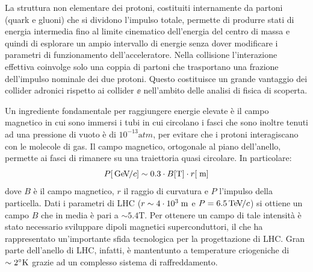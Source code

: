 La struttura non elementare dei protoni, costituiti internamente da partoni (quark e gluoni) che si dividono l'impulso totale, permette di produrre stati di energia intermedia fino al limite cinematico dell'energia del centro di massa e quindi di esplorare un ampio intervallo di energie senza dover modificare i parametri di funzionamento dell'acceleratore. Nella collisione l'interazione effettiva coinvolge solo una coppia di partoni che trasportano una frazione dell'impulso nominale dei due protoni. Questo costituisce un grande vantaggio dei collider adronici rispetto ai collider $\ee$ nell'ambito delle analisi di fisica di scoperta.


Un ingrediente fondamentale per raggiungere energie elevate \`e il campo magnetico in cui sono immersi i tubi in cui circolano i fasci che sono inoltre tenuti ad una pressione di vuoto è di $10^{-13}{\mathrm atm}$, per evitare che i protoni interagiscano con le molecole di gas. Il campo magnetico, ortogonale al piano dell'anello, permette ai fasci di rimanere su una traiettoria quasi circolare. In particolare:
\begin{equation}
P[{\rm \, Ge\kern-0.125em V}\kern-0.125em /c] \sim 0.3 \cdot B[{\mathrm T}] \cdot r[\rm \; m]
\end{equation}
dove $B$ è il campo magnetico, $r$ il raggio di curvatura e $P$ l'impulso della particella. Dati i parametri di LHC ($r\sim4 \cdot 10^3\rm \; m$ e $P=6.5{\rm \, Te\kern-0.125em V}\kern-0.125em /c$) si ottiene un campo $B$ che in media è pari a $\sim 5.4{\mathrm T}$. Per ottenere un campo di tale intensit\`a è stato necessario sviluppare dipoli magnetici superconduttori, il che ha rappresentato un'importante sfida tecnologica per la progettazione di LHC. Gran parte dell'anello di LHC, infatti, \`e mantentunto a temperature criogeniche di $\sim 2^\circ {\mathrm K}$ grazie ad un complesso sistema di raffreddamento.

